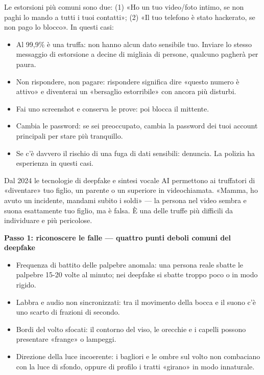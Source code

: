 
Le estorsioni più comuni sono due: (1) «Ho un tuo video/foto intimo, se non paghi lo mando a tutti i tuoi contatti»; (2) «Il tuo telefono è stato hackerato, se non pago lo blocco». In questi casi:

\begin{itemize}
  \item Al 99,9\% è una truffa: non hanno alcun dato sensibile tuo. Inviare lo stesso messaggio di estorsione a decine di migliaia di persone, qualcuno pagherà per paura.
  \item Non rispondere, non pagare: rispondere significa dire «questo numero è attivo» e diventerai un «bersaglio estorribile» con ancora più disturbi.
  \item Fai uno screenshot e conserva le prove: poi blocca il mittente.
  \item Cambia le password: se sei preoccupato, cambia la password dei tuoi account principali per stare più tranquillo.
  \item Se c'è davvero il rischio di una fuga di dati sensibili: denuncia. La polizia ha esperienza in questi casi.
\end{itemize}


Dal 2024 le tecnologie di deepfake e sintesi vocale AI permettono ai truffatori di «diventare» tuo figlio, un parente o un superiore in videochiamata. «Mamma, ho avuto un incidente, mandami subito i soldi» — la persona nel video sembra e suona esattamente tuo figlio, ma è falsa. È una delle truffe più difficili da individuare e più pericolose.

\textbf{Passo 1: riconoscere le falle — quattro punti deboli comuni del deepfake}\par

\begin{itemize}
  \item Frequenza di battito delle palpebre anomala: una persona reale sbatte le palpebre 15-20 volte al minuto; nei deepfake si sbatte troppo poco o in modo rigido.
  \item Labbra e audio non sincronizzati: tra il movimento della bocca e il suono c'è uno scarto di frazioni di secondo.
  \item Bordi del volto sfocati: il contorno del viso, le orecchie e i capelli possono presentare «frange» o lampeggi.
  \item Direzione della luce incoerente: i bagliori e le ombre sul volto non combaciano con la luce di sfondo, oppure di profilo i tratti «girano» in modo innaturale.
\end{itemize}

